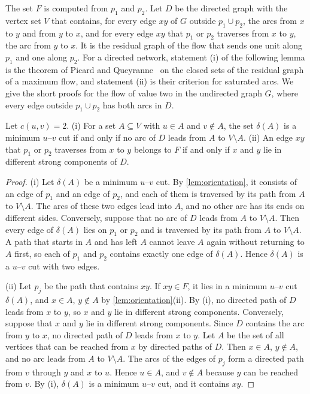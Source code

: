 \documentclass[pdflatex,sn-mathphys-num]{sn-jnl}%
\theoremstyle{thmstyleone}%
\theoremstyle{thmstyletwo}%
\theoremstyle{thmstylethree}%
\begin{document}
The set $F$ is computed from $p_1$ and $p_2$.
Let $D$ be the directed graph with the vertex set $V$ that contains, for every edge $xy$ of $G$ outside $p_1 \cup p_2$, the arcs from $x$ to $y$ and from $y$ to $x$, and for every edge $xy$ that $p_1$ or $p_2$ traverses from $x$ to $y$, the arc from $y$ to $x$.
It is the residual graph of the flow that sends one unit along $p_1$ and one along $p_2$.
For a directed network, statement (i) of the following lemma is the theorem of Picard and Queyranne~\cite{PicardQueyranne1980} on the closed sets of the residual graph of a maximum flow, and statement (ii) is their criterion for saturated arcs.
We give the short proofs for the flow of value two in the undirected graph $G$, where every edge outside $p_1 \cup p_2$ has both arcs in $D$.

\begin{lemma}
\label{lem:residual}
Let $c(u, v) = 2$.
(i) For a set $A \subseteq V$ with $u \in A$ and $v \notin A$, the set $\delta(A)$ is a minimum $u$--$v$ cut if and only if no arc of $D$ leads from $A$ to $V \setminus A$.
(ii) An edge $xy$ that $p_1$ or $p_2$ traverses from $x$ to $y$ belongs to $F$ if and only if $x$ and $y$ lie in different strong components of $D$.
\end{lemma}

\begin{proof}
(i) Let $\delta(A)$ be a minimum $u$--$v$ cut.
By \cref{lem:orientation}, it consists of an edge of $p_1$ and an edge of $p_2$, and each of them is traversed by its path from $A$ to $V \setminus A$.
The arcs of these two edges lead into $A$, and no other arc has its ends on different sides.
Conversely, suppose that no arc of $D$ leads from $A$ to $V \setminus A$.
Then every edge of $\delta(A)$ lies on $p_1$ or $p_2$ and is traversed by its path from $A$ to $V \setminus A$.
A path that starts in $A$ and has left $A$ cannot leave $A$ again without returning to $A$ first, so each of $p_1$ and $p_2$ contains exactly one edge of $\delta(A)$.
Hence $\delta(A)$ is a $u$--$v$ cut with two edges.

(ii) Let $p_j$ be the path that contains $xy$.
If $xy \in F$, it lies in a minimum $u$--$v$ cut $\delta(A)$, and $x \in A$, $y \notin A$ by \cref{lem:orientation}(ii).
By (i), no directed path of $D$ leads from $x$ to $y$, so $x$ and $y$ lie in different strong components.
Conversely, suppose that $x$ and $y$ lie in different strong components.
Since $D$ contains the arc from $y$ to $x$, no directed path of $D$ leads from $x$ to $y$.
Let $A$ be the set of all vertices that can be reached from $x$ by directed paths of $D$.
Then $x \in A$, $y \notin A$, and no arc leads from $A$ to $V \setminus A$.
The arcs of the edges of $p_j$ form a directed path from $v$ through $y$ and $x$ to $u$.
Hence $u \in A$, and $v \notin A$ because $y$ can be reached from $v$.
By (i), $\delta(A)$ is a minimum $u$--$v$ cut, and it contains $xy$.
\end{proof}
\end{document}
